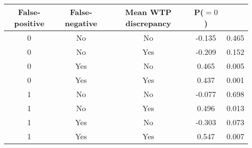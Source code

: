 \begin{table}[H]\centering \begin{tabular}{cccc} \hline \hline
\textbf{False-positive}&\textbf{False-negative}&\textbf{Mean WTP discrepancy}& \textbf{P($=0$)}\\ &No&No&-0.135&0.465\\
0&No&Yes&-0.209&0.152\\
0&Yes&No&0.465&0.005\\
0&Yes&Yes&0.437&0.001\\
1&No&No&-0.077&0.698\\
1&No&Yes&0.496&0.013\\
1&Yes&No&-0.303&0.073\\
1&Yes&Yes&0.547&0.007\\
\hline \end{tabular} \end{table}
